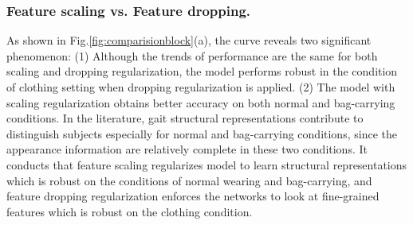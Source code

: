 \documentclass[runningheads]{llncs}
\begin{document}
\begin{table}[htbp]
\vspace*{-2em}
\caption{Gait recognition performance reported in \textit{rank-1} accuracy on CASIA-B.}
\vspace*{-1em}
\centering
\footnotesize
{}
\label{tab:partbased}
\vspace*{-2em}
\end{table}



\subsubsection{Feature scaling vs. Feature dropping.} As shown in Fig.\ref{fig:comparisionblock}(a), the curve reveals two significant phenomenon: (1) Although the trends of performance are the same for both scaling and dropping regularization, the model performs robust in the condition of clothing setting when dropping regularization is applied. (2) The model with scaling regularization obtains better accuracy on both normal and bag-carrying conditions. In the literature\cite{mesh,pami2020gaitnet}, gait structural representations contribute to distinguish subjects especially for normal and bag-carrying conditions, since the appearance information are relatively complete in these two conditions. It conducts that feature scaling regularizes model to learn structural representations which is robust on the conditions of normal wearing and bag-carrying, and feature dropping regularization enforces the networks to look at fine-grained features which is robust on the clothing condition.
\end{document}
